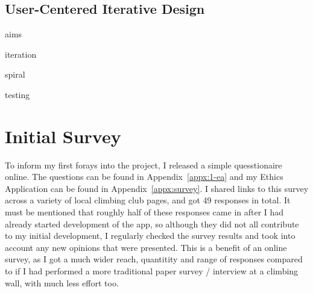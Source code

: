 \subsection{User-Centered Iterative Design}
aims

iteration

spiral

testing

\section{Initial Survey}
To inform my first forays into the project, I released a simple quesstionaire online.
The questions can be found in Appendix~\ref{appx:1-ea} and my Ethics Application can be found in Appendix~\ref{appx:survey}.
I shared links to this survey across a variety of local climbing club pages, and got 49 responses in total. 
It must be mentioned that roughly half of these responses came in after I had already started development of the app, so although they did not all contribute to my initial development, I regularly checked the survey results and took into account any new opinions that were presented.
This is a benefit of an online survey, as I got a much wider reach, quantitity and range of responses compared to if I had performed a more traditional paper survey / interview at a climbing wall, with much less effort too.

\clearpage

